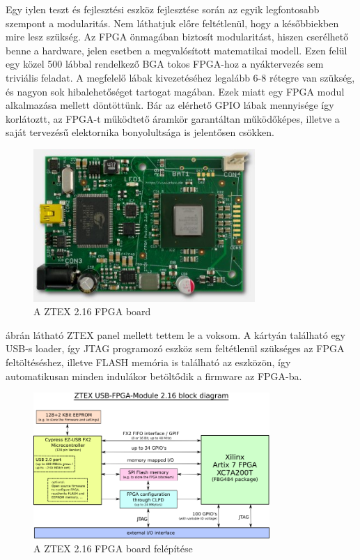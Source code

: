 Egy iylen teszt és fejlesztési eszköz fejlesztése során az egyik legfontosabb szempont a modularitás. Nem láthatjuk előre feltétlenül, hogy a későbbiekben mire lesz szükség. Az FPGA önmagában biztosít modularitást, hiszen cserélhető benne a hardware, jelen esetben a megvalósított matematikai modell. Ezen felül egy közel 500 lábbal rendelkező BGA tokos FPGA-hoz a nyáktervezés sem triviális feladat. A megfelelő lábak kivezetéséhez legalább 6-8 rétegre van szükség, és nagyon sok hibalehetőséget tartogat magában. Ezek miatt egy FPGA modul alkalmazása mellett döntöttünk. Bár az elérhető GPIO lábak mennyisége így korlátoztt, az FPGA-t működtető áramkör garantáltan működőképes, illetve a saját tervezésű elektornika bonyolultsága is jelentősen csökken.

\begin{figure}[!ht]
	\centering
	\includegraphics[width = 0.75\textwidth]{figures/fpga216.jpg}
	\caption{A ZTEX 2.16 FPGA board} 
	\label{fig:ztex}
\end{figure}

 ábrán látható ZTEX panel mellett tettem le a voksom. A kártyán található egy USB-s loader, így JTAG programozó eszköz sem feltétlenül szükséges az FPGA feltöltéséshez, illetve FLASH memória is található az eszközön, így automatikusan minden indulákor betöltődik a firmware az FPGA-ba.


\begin{figure}[!ht]
	\centering
	\includegraphics[width = 0.8\textwidth]{figures/usb-fpga-216.png}
	\caption{A ZTEX 2.16 FPGA board felépítése} 
	\label{fig:ztex_block}
\end{figure}

